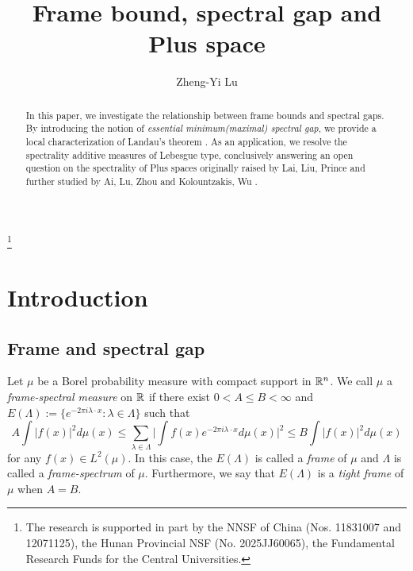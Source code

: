 \documentclass[12pt,psfig,reqno]{amsart}
\numberwithin{equation}{section}
\theoremstyle{plain}
\begin{document}
\title[Frame bound, spectral gap and Plus space]
{Frame bound, spectral gap and Plus space}


\author{Zheng-Yi Lu}



\address{ School of Mathematics, Hunan University, Changsha Hunan 410082, China}



\thanks{The research is supported in part by the NNSF of China (Nos. 11831007 and 12071125), the Hunan Provincial NSF (No. 2025JJ60065), the Fundamental
	Research Funds for the Central Universities.}


\begin{abstract}
In this paper, we investigate the relationship between frame bounds and spectral gaps. By introducing the notion of \emph{essential minimum(maximal) spectral gap}, we provide a local characterization of Landau's theorem \cite{Lan67}. As an application, we resolve the spectrality additive measures of Lebesgue type,  conclusively answering an open question on the spectrality of Plus spaces originally raised by Lai, Liu, Prince \cite{LLP21} and further studied by Ai, Lu, Zhou  \cite{ALZ23} and Kolountzakis, Wu \cite{KW25}. 
\end{abstract}

\maketitle
\section{Introduction }
\subsection{Frame and spectral gap}
Let $\mu$ be a Borel probability measure with compact support in $\Bbb R^n$. We call $\mu$ a {\textit{frame-spectral measure}} on $\Bbb R$ if there exist $0<A\leq B<\infty$ and  $E(\Lambda):=\{e^{-2\pi i\lambda \cdot x}:\lambda\in\Lambda\}$ such that 
$$
A\int|f(x)|^2d\mu(x)\leq \sum_{\lambda\in\Lambda}\Big|\int f(x)e^{-2\pi i\lambda\cdot x}d\mu(x)\Big|^2\leq B\int|f(x)|^2d\mu(x)
$$
for any $f(x)\in L^2(\mu)$. 
In this case, the $E(\Lambda)$ is called a \textit{frame} of $\mu$ and $\Lambda$ is called a \textit{frame-spectrum} of $\mu$. 
Furthermore, we say that $E(\Lambda)$ is a \textit{tight frame} of $\mu$ when $A=B$. 
\end{document}
